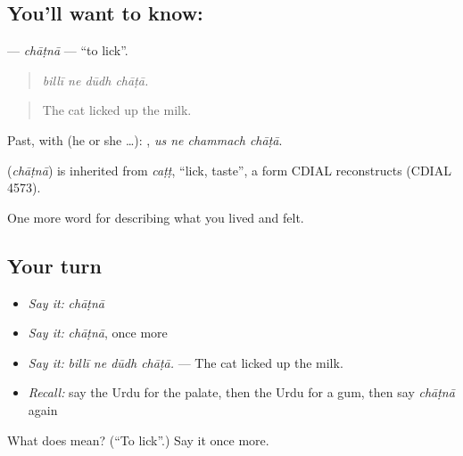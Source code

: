 \subsection*{You'll want to know: }
\textbf{} — \emph{chāṭnā} — \textquotedblleft{}to lick\textquotedblright{}.

\begin{quote}
   
\end{quote}

\begin{quote}
\emph{billī ne dūdh chāṭā.}
\end{quote}

\begin{quote}
The cat licked up the milk.
\end{quote}

Past, with  (he or she …):    , \emph{us ne chammach chāṭā}.

\begin{cousinweb}
\textbf{} (\emph{chāṭnā}) is inherited from \emph{caṭṭ}, \textquotedblleft{}lick, taste\textquotedblright{}, a form CDIAL reconstructs (CDIAL 4573).
\end{cousinweb}

\begin{grammarlens}[title={What you've built}]
One more word for describing what you lived and felt.
\end{grammarlens}

\subsection*{Your turn}
\begin{itemize}
\raggedright
  \item \emph{Say it:} \emph{chāṭnā}
  \item \emph{Say it:} \emph{chāṭnā}, once more
  \item \emph{Say it:} \emph{billī ne dūdh chāṭā.} — The cat licked up the milk.
  \item \emph{Recall:} say the Urdu for the palate, then the Urdu for a gum, then say \emph{chāṭnā} again
\end{itemize}

\begin{tcolorbox}[breakable,colback=teal!4,colframe=teal!35!black,title={Before you move on}]
What does  mean? (\textquotedblleft{}To lick\textquotedblright{}.) Say it once more.
\end{tcolorbox}
